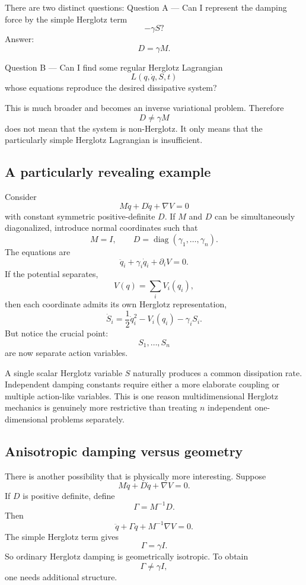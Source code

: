 There are two distinct questions:
Question A --- Can I represent the damping force by the simple Herglotz term $$ -\gamma S? $$ Answer: $$ \boxed{D=\gamma M.} $$

Question B --- Can I find some regular Herglotz Lagrangian
$$ L(q,\dot q,S,t) $$
whose equations reproduce the desired dissipative system?

This is much broader and becomes an inverse variational problem.
Therefore $$ \boxed{ D\neq\gamma M } $$
does not mean that the system is non-Herglotz.
It only means that the particularly simple Herglotz Lagrangian is insufficient.

\subsection{A particularly revealing example}

Consider $$ M\ddot q+D\dot q+\nabla V=0 $$
with constant symmetric positive-definite \(D\).
If \(M\) and \(D\) can be simultaneously diagonalized, introduce normal coordinates such that
$$ M=I, \qquad D= \operatorname{diag} (\gamma_1,\ldots,\gamma_n). $$
The equations are
$$ \ddot q_i+\gamma_i\dot q_i+\partial_iV=0. $$
If the potential separates,
$$ V(q)=\sum_iV_i(q_i), $$
then each coordinate admits its own Herglotz representation,
$$ \dot S_i = \frac12\dot q_i^2-V_i(q_i)-\gamma_iS_i. $$
But notice the crucial point:
$$ \boxed{ S_1,\ldots,S_n } $$
are now separate action variables.

A single scalar Herglotz variable \(S\) naturally produces a common dissipation rate. Independent damping constants require either a more elaborate coupling or multiple action-like variables.
This is one reason multidimensional Herglotz mechanics is genuinely more restrictive than treating \(n\) independent one-dimensional problems separately.

\subsection{Anisotropic damping versus geometry}

There is another possibility that is physically more interesting.
Suppose $$ M\ddot q+D\dot q+\nabla V=0. $$
If \(D\) is positive definite, define $$ \Gamma=M^{-1}D. $$
Then $$ \ddot q+\Gamma\dot q+M^{-1}\nabla V=0. $$
The simple Herglotz term gives $$ \Gamma=\gamma I. $$
So ordinary Herglotz damping is geometrically isotropic.
To obtain $$ \Gamma\neq\gamma I, $$
one needs additional structure.

